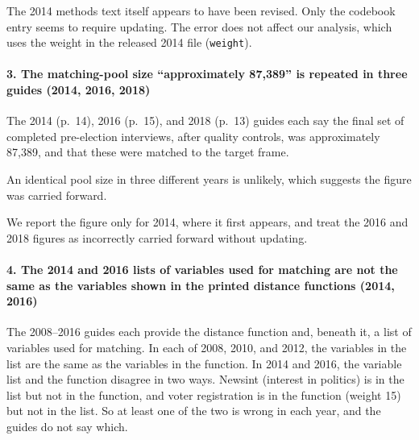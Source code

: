 \documentclass[12pt]{article}
\begin{document}

The 2014 methods text itself appears to have been revised. Only the codebook entry seems to require updating. The error does not affect our analysis, which uses the weight in the released 2014 file (\texttt{weight}).

\paragraph*{3. The matching-pool size ``approximately 87,389'' is repeated in three guides (2014, 2016, 2018)}
The 2014 (p.~14), 2016 (p.~15), and 2018 (p.~13) guides each say the final set of completed pre-election interviews, after quality controls, was approximately 87,389, and that these were matched to the target frame.




An identical pool size in three different years is unlikely, which suggests the figure was carried forward.

We report the figure only for 2014, where it first appears, and treat the 2016 and 2018 figures as incorrectly carried forward without updating.

\paragraph*{4. The 2014 and 2016 lists of variables used for matching are not the same as the variables shown in the printed distance functions (2014, 2016)}
The 2008--2016 guides each provide the distance function and, beneath it, a list of variables used for matching. In each of 2008, 2010, and 2012, the variables in the list are the same as the variables in the function. In 2014 and 2016, the variable list and the function disagree in two ways. Newsint (interest in politics) is in the list but not in the function, and voter registration is in the function (weight 15) but not in the list. So at least one of the two is wrong in each year, and the guides do not say which.

\end{document}
